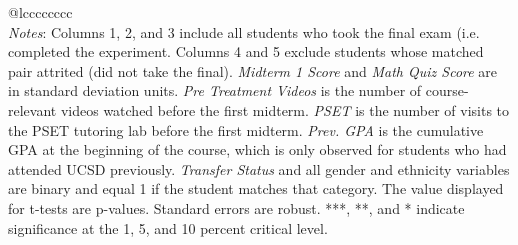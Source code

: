 \begin{tabular}{@{\extracolsep{5pt}}lcccccccc}
\hline \hline \\[-1.8ex]
{\textit{Notes}: Columns 1, 2, and 3 include all students who took the final exam (i.e. completed the  experiment. Columns 4 and 5 exclude students whose matched pair attrited (did not take the final).  \textit{Midterm 1 Score} and \textit{Math Quiz Score} are in standard  deviation units. \textit{Pre Treatment Videos} is the number of course-relevant  videos watched before the first midterm. \textit{PSET} is the number of visits  to the PSET tutoring lab before the first midterm. \textit{Prev. GPA} is the cumulative  GPA at the beginning of the course, which is only observed for students who had attended  UCSD previously. \textit{Transfer Status} and all gender and ethnicity variables  are binary and equal 1 if the student matches that category.  The value displayed for t-tests are p-values. Standard errors are robust. ***, **, and * indicate significance at the 1, 5, and 10 percent critical level. }
\end{tabular}
